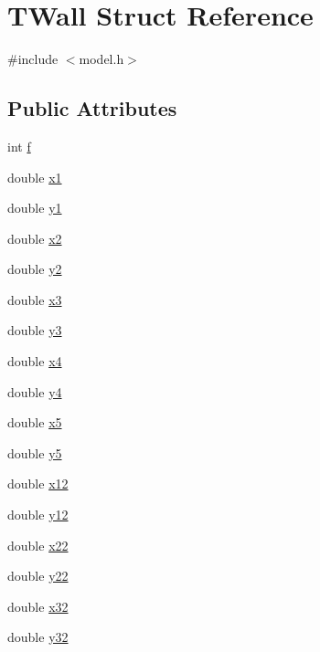\hypertarget{struct_t_wall}{}\section{T\+Wall Struct Reference}
\label{struct_t_wall}


{\ttfamily \#include $<$model.\+h$>$}

\subsection*{Public Attributes}
\begin{DoxyCompactItemize}
\item 
int \hyperlink{struct_t_wall_ad101245db5d232b1fdbe4b0267c37cd6}{f}
\item 
double \hyperlink{struct_t_wall_a099009138fe396e52736eae5335c688a}{x1}
\item 
double \hyperlink{struct_t_wall_ad18a3408e67aad6d0f9ff257f85a6749}{y1}
\item 
double \hyperlink{struct_t_wall_a589390e70204b2c6f5f5e6d16ff1c1ad}{x2}
\item 
double \hyperlink{struct_t_wall_a53de657c3d716b7db97aad6e6bb1da72}{y2}
\item 
double \hyperlink{struct_t_wall_aa5d9d54bf711a2d904528d41cbfe065c}{x3}
\item 
double \hyperlink{struct_t_wall_a5da1ee9f2aa1ee78e3d4d75850833563}{y3}
\item 
double \hyperlink{struct_t_wall_a7dbf8c222ef9aa20d3c108c7ba675939}{x4}
\item 
double \hyperlink{struct_t_wall_a638078bb94d412cd0a59584ad2a35717}{y4}
\item 
double \hyperlink{struct_t_wall_af487b808af9a8e9d4b06529f552e8549}{x5}
\item 
double \hyperlink{struct_t_wall_affb011f427ae51e9c47b4a319e5a0d1d}{y5}
\item 
double \hyperlink{struct_t_wall_ac0fb2d0b84a9a5d603a45d42411292df}{x12}
\item 
double \hyperlink{struct_t_wall_a77712bef2d32245a39472280d4fd2a55}{y12}
\item 
double \hyperlink{struct_t_wall_a109e52dff555d4a4f7156259aa33196d}{x22}
\item 
double \hyperlink{struct_t_wall_a0bbc6774b1a02a2839735929568bf308}{y22}
\item 
double \hyperlink{struct_t_wall_aa8567f7073bbb117d4c451d4763d4e1c}{x32}
\item 
double \hyperlink{struct_t_wall_a2edc6949ff7a6108a432a2ec32409e61}{y32}

\end{DoxyCompactItemize}
